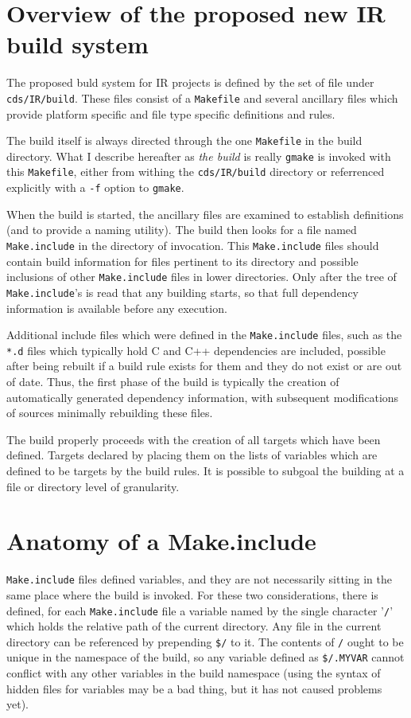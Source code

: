 \documentclass{article}
\begin{document}
\section{Overview of the proposed new IR build system}

The proposed buld system for IR projects is defined by the set of
file under \verb+cds/IR/build+.  These files consist of a \verb+Makefile+
and several ancillary files which provide platform specific and file
type specific definitions and rules.

The build itself is always directed through the one \verb+Makefile+ in
the build directory.  What I describe hereafter as {\em the build} is
really \verb+gmake+ is invoked with this \verb+Makefile+, either from
withing the \verb+cds/IR/build+ directory or referrenced explicitly
with a \verb+-f+ option to \verb+gmake+.

When the build is started, the ancillary files are examined to
establish definitions (and to provide a naming utility).  The build
then looks for a file named \verb+Make.include+ in the directory of
invocation.  This \verb+Make.include+ files should contain build
information for files pertinent to its directory and possible
inclusions of other \verb+Make.include+ files in lower directories.
Only after the tree of \verb+Make.include+'s is read that any building
starts, so that full dependency information is available before any
execution.

Additional include files which were defined in the \verb+Make.include+
files, such as the \verb+*.d+ files which typically hold C and C++
dependencies are included, possible after being rebuilt if a build
rule exists for them and they do not exist or are out of date.  Thus,
the first phase of the build is typically the creation of automatically
generated dependency information, with subsequent modifications of
sources minimally rebuilding these files.

The build properly proceeds with the creation of all targets which
have been defined.  Targets declared by placing them on the lists of
variables which are defined to be targets by the build rules.  It
is possible to subgoal the building at a file or directory level of
granularity.

\section{Anatomy of a Make.include}

\verb+Make.include+ files defined variables, and they are not
necessarily sitting in the same place where the build is invoked.  For
these two considerations, there is defined, for each
\verb+Make.include+ file a variable named by the single character
'\verb+/+' which holds the relative path of the current directory.
Any file in the current directory can be referenced by prepending
\verb+$/+ to it.  The contents of \verb+/+ ought to be unique in the
namespace of the build, so any variable defined as \verb+$/.MYVAR+
cannot conflict with any other variables in the build namespace (using
the syntax of hidden files for variables may be a bad thing, but it
has not caused problems yet).
\end{document}
